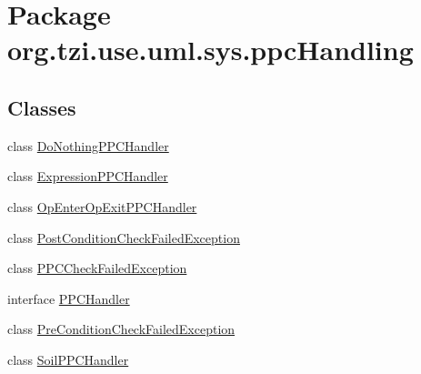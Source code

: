 \hypertarget{namespaceorg_1_1tzi_1_1use_1_1uml_1_1sys_1_1ppc_handling}{\section{Package org.\-tzi.\-use.\-uml.\-sys.\-ppc\-Handling}
\label{namespaceorg_1_1tzi_1_1use_1_1uml_1_1sys_1_1ppc_handling}
}
\subsection*{Classes}
\begin{DoxyCompactItemize}
\item 
class \hyperlink{classorg_1_1tzi_1_1use_1_1uml_1_1sys_1_1ppc_handling_1_1_do_nothing_p_p_c_handler}{Do\-Nothing\-P\-P\-C\-Handler}
\item 
class \hyperlink{classorg_1_1tzi_1_1use_1_1uml_1_1sys_1_1ppc_handling_1_1_expression_p_p_c_handler}{Expression\-P\-P\-C\-Handler}
\item 
class \hyperlink{classorg_1_1tzi_1_1use_1_1uml_1_1sys_1_1ppc_handling_1_1_op_enter_op_exit_p_p_c_handler}{Op\-Enter\-Op\-Exit\-P\-P\-C\-Handler}
\item 
class \hyperlink{classorg_1_1tzi_1_1use_1_1uml_1_1sys_1_1ppc_handling_1_1_post_condition_check_failed_exception}{Post\-Condition\-Check\-Failed\-Exception}
\item 
class \hyperlink{classorg_1_1tzi_1_1use_1_1uml_1_1sys_1_1ppc_handling_1_1_p_p_c_check_failed_exception}{P\-P\-C\-Check\-Failed\-Exception}
\item 
interface \hyperlink{interfaceorg_1_1tzi_1_1use_1_1uml_1_1sys_1_1ppc_handling_1_1_p_p_c_handler}{P\-P\-C\-Handler}
\item 
class \hyperlink{classorg_1_1tzi_1_1use_1_1uml_1_1sys_1_1ppc_handling_1_1_pre_condition_check_failed_exception}{Pre\-Condition\-Check\-Failed\-Exception}
\item 
class \hyperlink{classorg_1_1tzi_1_1use_1_1uml_1_1sys_1_1ppc_handling_1_1_soil_p_p_c_handler}{Soil\-P\-P\-C\-Handler}
\end{DoxyCompactItemize}
